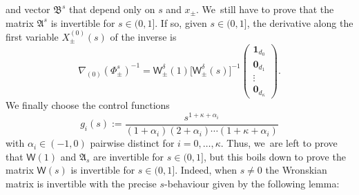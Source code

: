 \documentclass[JEP,XML,SOM,Unicode,NoFloatCountersInSection,published]{cedram}
\theoremstyle{definition}
\newcommand{\sW}{{\mathsf W}}
\newcommand{\U}{\mathbf{1}}
\newcommand{\V}{\mathbf{0}}
\begin{document}
and vector $\mathfrak B^s$ that depend only on $s$ and $x_\pm$. We~still have to prove that the matrix $\mathfrak A^s$ is
invertible for $s \in (0,1]$. If so, given $s \in (0,1]$, the
derivative along the first variable $X^{(0)}_\pm(s)$ of the
inverse is
\begin{equation}
\label{eq:first-der-k}
\nabla_{(0)} \left(\Phi_\pm ^s \right)^{-1} = \sW_\pm ^\delta
(1) \big[\sW_\pm ^\delta(s)\big]^{-1}
\begin{pmatrix}
\U_{d_0} \\ \V_{d_1} \\ \vdots \\ \V_{d_\kappa}
\end{pmatrix}\!.
\end{equation}
We finally choose the control functions
\begin{equation}\label{eq:choice-g}
g_i(s) := \frac{s^{1+\kappa+\alpha_i}}{(1+\alpha_i)(2+\alpha_i)
\cdots (1+\kappa+\alpha_i)}
\end{equation}
with $\alpha_i \in (-1,0)$ pairwise distinct for
$i=0,\dots,\kappa$.
Thus, we~are left to prove that $\mathsf W(1)$ and $\mathfrak{A}_s$ are invertible for $s \in (0,1]$, but this boils down to prove the matrix $\mathsf W(s)$ is invertible for $s \in (0,1]$. Indeed, when $s \ne 0$ the Wronskian matrix is
invertible with the precise $s$-behaviour given by the following
lemma:
\end{document}
